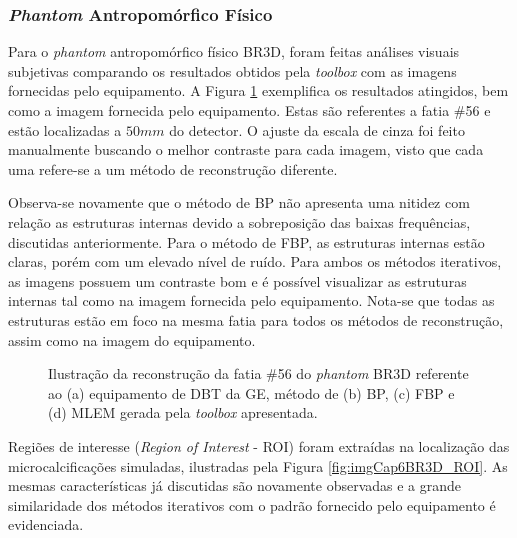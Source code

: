 \subsubsection{\textit{Phantom} Antropomórfico Físico}

Para o \textit{phantom} antropomórfico físico BR3D, foram feitas análises visuais subjetivas comparando os resultados obtidos pela \textit{toolbox} com as imagens fornecidas pelo equipamento. A Figura \ref{fig:imgCap6BR3D} exemplifica os resultados atingidos, bem como a imagem fornecida pelo equipamento. Estas são referentes a fatia \#56 e estão localizadas a $50mm$ do detector. O ajuste da escala de cinza foi feito manualmente buscando o melhor contraste para cada imagem, visto que cada uma refere-se a um método de reconstrução diferente.

Observa-se novamente que o método de \acs{BP} não apresenta uma nitidez com relação as estruturas internas devido a sobreposição das baixas frequências, discutidas anteriormente. Para o método de \acs{FBP}, as estruturas internas estão claras, porém com um elevado nível de ruído. Para ambos os métodos iterativos, as imagens possuem um contraste bom e é possível visualizar as estruturas internas tal como na imagem fornecida pelo equipamento. Nota-se que todas as estruturas estão em foco na mesma fatia para todos os métodos de reconstrução, assim como na imagem do equipamento.

\begin{figure}[!h]
	\centering	
	\caption{Ilustração da reconstrução da fatia \#56 do \textit{phantom} BR3D referente ao (a) equipamento de \acs{DBT} da \acs{GE}, método de (b) \acs{BP}, (c) \acs{FBP} e (d) \acs{MLEM} gerada pela \textit{toolbox} apresentada.}
	\hfill
	\hfill
	
	\hfil
	\label{fig:imgCap6BR3D}
\end{figure}

Regiões de interesse (\textit{Region of Interest} - \acs{ROI}) foram extraídas na localização das microcalcificações simuladas, ilustradas pela Figura \ref{fig:imgCap6BR3D_ROI}. As mesmas características já discutidas são novamente observadas e a grande similaridade dos métodos iterativos com o padrão fornecido pelo equipamento é evidenciada.

